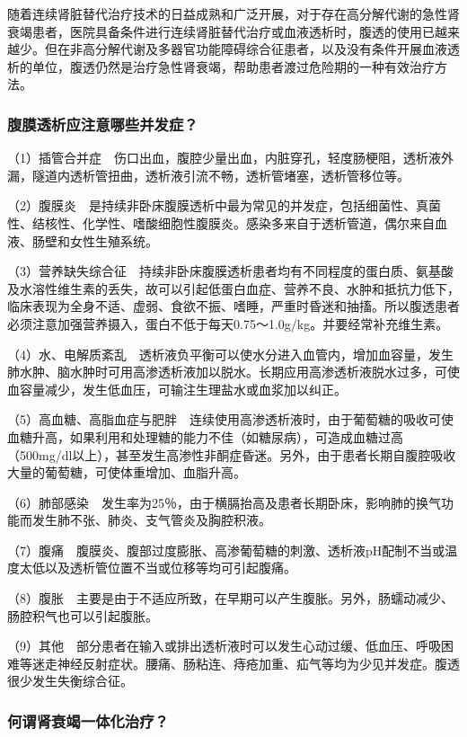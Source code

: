 随着连续肾脏替代治疗技术的日益成熟和广泛开展，对于存在高分解代谢的急性肾衰竭患者，医院具备条件进行连续肾脏替代治疗或血液透析时，腹透的使用已越来越少。但在非高分解代谢及多器官功能障碍综合征患者，以及没有条件开展血液透析的单位，腹透仍然是治疗急性肾衰竭，帮助患者渡过危险期的一种有效治疗方法。

\subsubsection{腹膜透析应注意哪些并发症？}

（1）插管合并症　伤口出血，腹腔少量出血，内脏穿孔，轻度肠梗阻，透析液外漏，隧道内透析管扭曲，透析液引流不畅，透析管堵塞，透析管移位等。

（2）腹膜炎　是持续非卧床腹膜透析中最为常见的并发症，包括细菌性、真菌性、结核性、化学性、嗜酸细胞性腹膜炎。感染多来自于透析管道，偶尔来自血液、肠壁和女性生殖系统。

（3）营养缺失综合征　持续非卧床腹膜透析患者均有不同程度的蛋白质、氨基酸及水溶性维生素的丢失，故可以引起低蛋白血症、营养不良、水肿和抵抗力低下，临床表现为全身不适、虚弱、食欲不振、嗜睡，严重时昏迷和抽搐。所以腹透患者必须注意加强营养摄入，蛋白不低于每天0.75～1.0g/kg。并要经常补充维生素。

（4）水、电解质紊乱　透析液负平衡可以使水分进入血管内，增加血容量，发生肺水肿、脑水肿时可用高渗透析液加以脱水。长期应用高渗透析液脱水过多，可使血容量减少，发生低血压，可输注生理盐水或血浆加以纠正。

（5）高血糖、高脂血症与肥胖　连续使用高渗透析液时，由于葡萄糖的吸收可使血糖升高，如果利用和处理糖的能力不佳（如糖尿病），可造成血糖过高（500mg/dl以上），甚至发生高渗性非酮症昏迷。另外，由于患者长期自腹腔吸收大量的葡萄糖，可使体重增加、血脂升高。

（6）肺部感染　发生率为25％，由于横膈抬高及患者长期卧床，影响肺的换气功能而发生肺不张、肺炎、支气管炎及胸腔积液。

（7）腹痛　腹膜炎、腹部过度膨胀、高渗葡萄糖的刺激、透析液pH配制不当或温度太低以及透析管位置不当或位移等均可引起腹痛。

（8）腹胀　主要是由于不适应所致，在早期可以产生腹胀。另外，肠蠕动减少、肠腔积气也可以引起腹胀。

（9）其他　部分患者在输入或排出透析液时可以发生心动过缓、低血压、呼吸困难等迷走神经反射症状。腰痛、肠粘连、痔疮加重、疝气等均为少见并发症。腹透很少发生失衡综合征。

\subsubsection{何谓肾衰竭一体化治疗？}

